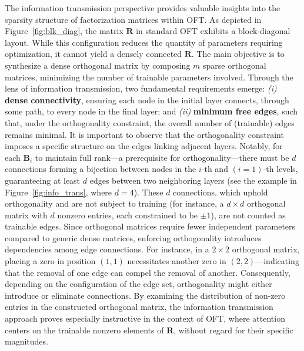 The information transmission perspective provides valuable insights into the sparsity structure of factorization matrices within OFT. As depicted in Figure~\ref{fig:blk_diag}, the matrix $\bm{R}$ in standard OFT exhibits a block-diagonal layout. While this configuration reduces the quantity of parameters requiring optimization, it cannot yield a densely connected $\bm{R}$. The main objective is to synthesize a dense orthogonal matrix by composing $m$ sparse orthogonal matrices, minimizing the number of trainable parameters involved. Through the lens of information transmission, two fundamental requirements emerge: \emph{(i)} \textbf{dense connectivity}, ensuring each node in the initial layer connects, through some path, to every node in the final layer; and \emph{(ii)} \textbf{minimum free edges}, such that, under the orthogonality constraint, the overall number of (trainable) edges remains minimal. It is important to observe that the orthogonality constraint imposes a specific structure on the edges linking adjacent layers. Notably, for each $\bm{B}_i$ to maintain full rank—a prerequisite for orthogonality—there must be $d$ connections forming a bijection between nodes in the $i$-th and $(i=1)$-th levels, guaranteeing at least $d$ edges between two neighboring layers (see the example in Figure~\ref{fig:info_trans}, where $d=4$). These $d$ connections, which uphold orthogonality and are not subject to training (for instance, a $d\times d$ orthogonal matrix with $d$ nonzero entries, each constrained to be $\pm 1$), are not counted as trainable edges. Since orthogonal matrices require fewer independent parameters compared to generic dense matrices, enforcing orthogonality introduces dependencies among edge connections. For instance, in a $2\times 2$ orthogonal matrix, placing a zero in position $(1,1)$ necessitates another zero in $(2,2)$—indicating that the removal of one edge can compel the removal of another. Consequently, depending on the configuration of the edge set, orthogonality might either introduce or eliminate connections. By examining the distribution of non-zero entries in the constructed orthogonal matrix, the information transmission approach proves especially instructive in the context of OFT, where attention centers on the trainable nonzero elements of $\bm{R}$, without regard for their specific magnitudes.

